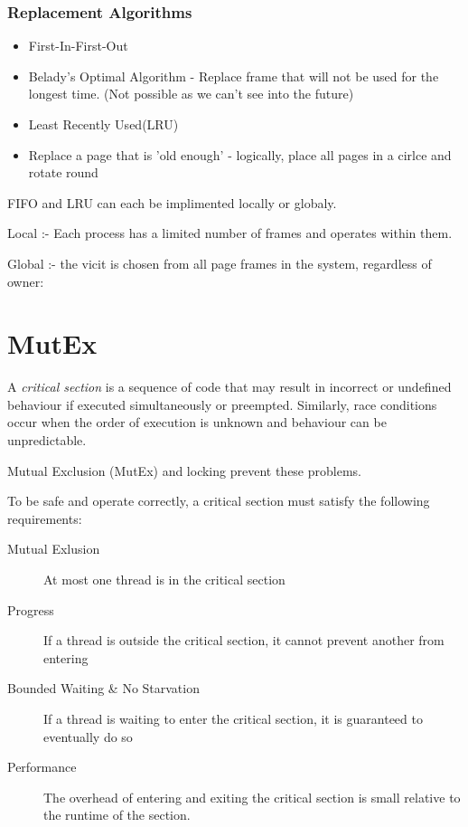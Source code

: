 \documentclass{article}
\begin{document}
\subsubsection{Replacement Algorithms}
\begin{itemize}
    \item First-In-First-Out
    \item Belady's Optimal Algorithm - Replace frame that will not be used for the longest time.
        (Not possible as we can't see into the future)
    \item Least Recently Used(LRU)
    \item Replace a page that is 'old enough' - logically, place all pages in a cirlce and rotate round

\end{itemize}

\vspace{0.5cm}

FIFO and LRU can each be implimented locally or globaly.

Local :- Each process has a limited number of frames and operates within them.

Global :- the vicit is chosen from all page frames in the system, regardless of owner:



\filbreak
\section{MutEx}\label{mutex}

A \emph{critical section} is a sequence of code that may result in
incorrect or undefined behaviour if executed simultaneously or
preempted. Similarly, race conditions occur when the order of execution
is unknown and behaviour can be unpredictable.

Mutual Exclusion (MutEx) and locking prevent these problems.

To be safe and operate correctly, a critical section must satisfy the
following requirements:

\begin{description}
\item[Mutual Exlusion]
At most one thread is in the critical section
\item[Progress]
If a thread is outside the critical section, it cannot prevent another
from entering
\item[Bounded Waiting \& No Starvation]
If a thread is waiting to enter the critical section, it is guaranteed
to eventually do so
\item[Performance]
The overhead of entering and exiting the critical section is small
relative to the runtime of the section.
\end{description}
\end{document}
